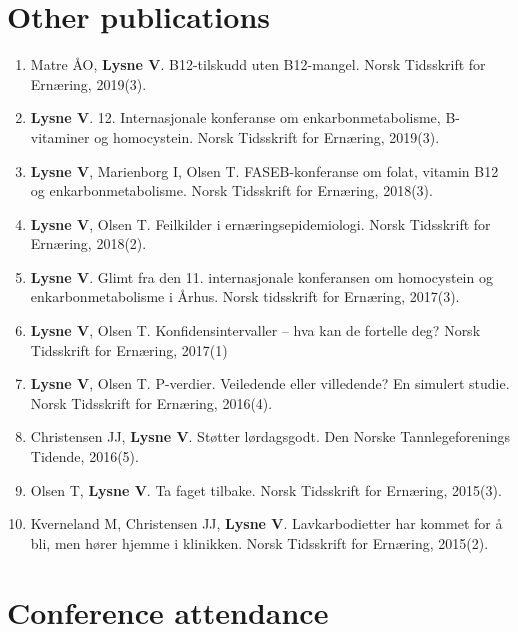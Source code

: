 \documentclass[11pt, a4paper]{awesome-cv}
\providecommand{\tightlist}{%
	\setlength{\itemsep}{0pt}\setlength{\parskip}{0pt}}
\begin{document}
\hypertarget{other-publications}{%
\section{Other publications}\label{other-publications}}

\begin{enumerate}
\def\labelenumi{\arabic{enumi}.}
\tightlist
\item
  Matre ÅO, \textbf{Lysne V}. B12-tilskudd uten B12-mangel. Norsk Tidsskrift for Ernæring, 2019(3).
\item
  \textbf{Lysne V}. 12. Internasjonale konferanse om enkarbonmetabolisme, B-vitaminer og homocystein. Norsk Tidsskrift for Ernæring, 2019(3).
\item
  \textbf{Lysne V}, Marienborg I, Olsen T. FASEB-konferanse om folat, vitamin B12 og enkarbonmetabolisme. Norsk Tidsskrift for Ernæring, 2018(3).
\item
  \textbf{Lysne V}, Olsen T. Feilkilder i ernæringsepidemiologi. Norsk Tidsskrift for Ernæring, 2018(2).
\item
  \textbf{Lysne V}. Glimt fra den 11. internasjonale konferansen om homocystein og enkarbonmetabolisme i Århus. Norsk tidsskrift for Ernæring, 2017(3).
\item
  \textbf{Lysne V}, Olsen T. Konfidensintervaller -- hva kan de fortelle deg? Norsk Tidsskrift for Ernæring, 2017(1)
\item
  \textbf{Lysne V}, Olsen T. P-verdier. Veiledende eller villedende? En simulert studie. Norsk Tidsskrift for Ernæring, 2016(4).
\item
  Christensen JJ, \textbf{Lysne V}. Støtter lørdagsgodt. Den Norske Tannlegeforenings Tidende, 2016(5).
\item
  Olsen T, \textbf{Lysne V}. Ta faget tilbake. Norsk Tidsskrift for Ernæring, 2015(3).
\item
  Kverneland M, Christensen JJ, \textbf{Lysne V}. Lavkarbodietter har kommet for å bli, men hører hjemme i klinikken. Norsk Tidsskrift for Ernæring, 2015(2).
\end{enumerate}

\hypertarget{conference-attendance}{%
\section{Conference attendance}\label{conference-attendance}}
\end{document}
